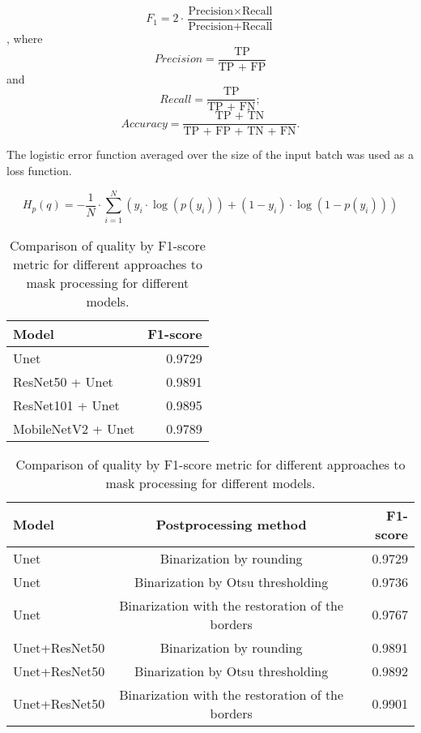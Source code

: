 \documentclass[runningheads]{llncs}
\begin{document}
$$
F_{1}=2 \cdot \frac{\text{Precision} \times \text{Recall}}{\text{Precision} + \text{Recall}}
$$
, where
\[
Precision=\frac{\text{TP}}{\text{TP + FP} }
\]
and
\[
Recall=\frac{\text{TP}}{\text{TP + FN} };
\]
\[
Accuracy=\frac{\text{TP + TN}}{\text{TP + FP + TN + FN} }.
\]

The logistic error function averaged over the size of the input batch was used as a loss function.

\[
H_{p}(q)= -\frac{1}{N} \cdot \sum_{i=1}^{N}(y_{i} \cdot \log{(p(y_{i}))} + (1 - y_{i}) \cdot \log{(1 - p(y_{i}))})
\]

\begin{table}[H]
    \begin{minipage}{.45\linewidth}
      \centering
\caption{Comparison of F1-score metric of different encoder-parts.}
\label{tab2}
       \begin{tabular}{|l|r|}
\hline
Model &  F1-score \\
\hline
Unet &  0.9729 \\ 
ResNet50 + Unet & 0.9891\\ 
ResNet101 + Unet & 0.9895\\ 
MobileNetV2 + Unet & 0.9789\\ \hline
\end{tabular}

    \end{minipage}%
	\hspace{2em}
    \begin{minipage}{.45\linewidth}
      \centering
      \caption{Comparison of quality by F1-score metric for different approaches to mask processing for different models.}
\label{tab3}
        \begin{tabular}{|l|c|r|}
\hline
Model & Postprocessing method & F1-score\\
\hline
Unet & Binarization by rounding & 0.9729 \\
Unet & Binarization by Otsu thresholding & 0.9736 \\ 
Unet & Binarization with the restoration of the borders &  0.9767 \\ 
Unet+ResNet50 & Binarization by rounding & 0.9891 \\ 
Unet+ResNet50 & Binarization by Otsu thresholding & 0.9892 \\
Unet+ResNet50 & Binarization with the restoration of the borders & 0.9901 \\ \hline
\end{tabular}
    \end{minipage} 
\end{table}
\end{document}
